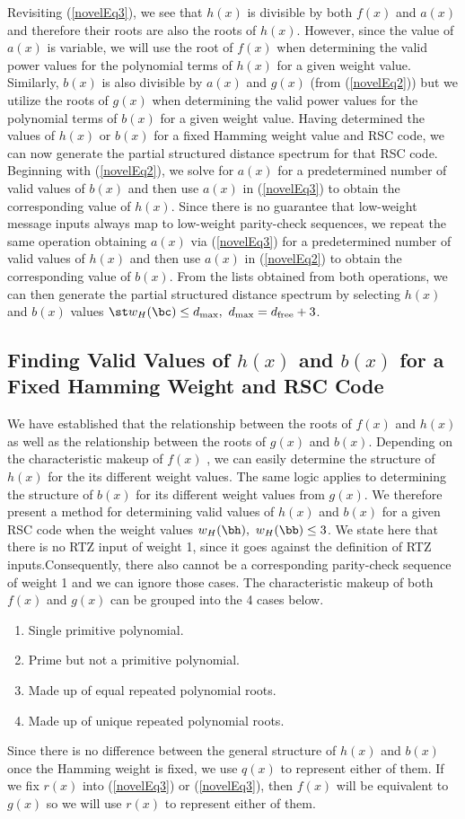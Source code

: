 Revisiting (\ref{novelEq3}), we see that $h(x)$ is divisible by both $f(x)$ and $a(x)$ and therefore their roots are also the roots of $h(x)$. However, since the value of $a(x)$ is variable, we will use the root of $f(x)$ when determining  the valid power values for the polynomial  terms of $h(x)$ for a given weight value. Similarly, $b(x)$ is also divisible by $a(x)$ and $g(x)$ (from (\ref{novelEq2})) but we utilize the roots of $g(x)$ when determining the valid power values for the polynomial  terms of  $b(x)$ for a given weight value.  
Having determined the values of $h(x)$ or $b(x)$ for a fixed Hamming weight value and RSC code, we can now generate the partial structured distance spectrum for that RSC code. Beginning with (\ref{novelEq2}), we  solve for $a(x)$ for a predetermined number of valid values of $b(x)$ and then use $a(x)$ in (\ref{novelEq3}) to obtain the corresponding value of $h(x)$. Since there is no guarantee that low-weight message inputs always map to low-weight parity-check sequences, we repeat the same operation obtaining $a(x)$ via (\ref{novelEq3}) for a predetermined number of valid values of $h(x)$ and then use $a(x)$ in (\ref{novelEq2}) to obtain the corresponding value of $b(x)$. From the lists obtained from both operations, we can then generate the partial structured distance spectrum by selecting $h(x)$ and $b(x)$ values $\st w_H(\bc) \leq d_{\text{max}},~d_{\text{max}}=d_{\text{free}}+3$.

\subsection{Finding Valid Values of $h(x)$ and $b(x)$ for a Fixed Hamming Weight and RSC Code}
We have established that the relationship between the roots of $f(x)$ and $h(x)$ as well as the relationship between the roots of $g(x)$ and $b(x)$. Depending on the characteristic makeup of $f(x)$ , we can easily determine the structure of $h(x)$ for the its different weight values. The same logic applies to determining the structure of $b(x)$ for its different weight values from $g(x)$. 
We therefore present a method for determining valid values of $h(x)$ and $b(x)$ for a given RSC code when the weight values $w_H(\bh),~w_H(\bb) \leq 3$. We state here that there is no RTZ input of weight 1, since it goes against the definition of RTZ inputs.Consequently, there also cannot be a corresponding parity-check sequence of weight 1 and we can ignore those cases. 
The characteristic makeup of both $f(x)$ and $g(x)$ can be grouped into the 4 cases below. 
\begin{enumerate}
\item Single primitive polynomial.
\item Prime but not a primitive polynomial.
\item Made up of equal repeated polynomial roots.
\item Made up of unique repeated polynomial roots.
\end{enumerate}
Since there is no difference between the general structure of $h(x)$ and $b(x)$ once the Hamming weight is fixed, we use $q(x)$ to represent either of them.  If we fix $r(x)$ into (\ref{novelEq3}) or (\ref{novelEq3}), then $f(x)$ will be equivalent to$g(x)$ so we will use $r(x)$ to represent either of them. 
\newpage
